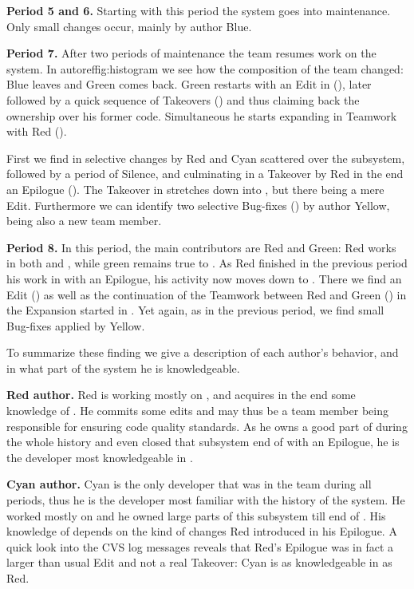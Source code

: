 \textbf{Period 5 and 6.} Starting with this period the system goes into maintenance. Only small changes occur, mainly by author Blue.

\textbf{Period 7.} After two periods of maintenance the team resumes work on the system. In autoref{fig:histogram} we see how the composition of the team changed: Blue leaves and Green comes back. Green restarts with an Edit in  (), later followed by a quick sequence of Takeovers () and thus claiming back the ownership over his former code. Simultaneous he starts expanding  in Teamwork with Red ().

First we find in  selective changes by Red and Cyan scattered over the subsystem, followed by a period of Silence, and culminating in a Takeover by Red in the end \ie an Epilogue (). The Takeover in  stretches down into , but there being a mere Edit. Furthermore we can identify two selective Bug-fixes () by author Yellow, being also a new team member.

\textbf{Period 8.} In this period, the main contributors are Red and Green: Red works in both  and , while green remains true to . As Red finished in the previous period his work in  with an Epilogue, his activity now moves down to . There we find an Edit () as well as the continuation of the Teamwork between Red and Green () in the Expansion started in . Yet again, as in the previous period, we find small Bug-fixes applied by Yellow.

To summarize these finding we give a description of each author's behavior, and in what part of the system he is knowledgeable.

\textbf{Red author.} Red is working mostly on , and acquires in the end some knowledge of . He commits some edits and may thus be a team member being responsible for ensuring code quality standards. As he owns a good part of  during the whole history and even closed that subsystem end of  with an Epilogue, he is the developer most knowledgeable in .

\textbf{Cyan author.} Cyan is the only developer that was in the team during all periods, thus he is the developer most familiar with the history of the system. He worked mostly on  and he owned large parts of this subsystem till end of . His knowledge of  depends on the kind of changes Red introduced in his Epilogue. A quick look into the CVS log messages reveals that Red's Epilogue was in fact a larger than usual Edit and not a real Takeover: Cyan is as knowledgeable in  as Red.

